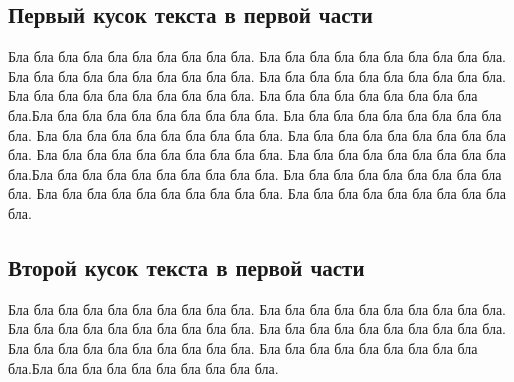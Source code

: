 \documentclass[12pt, a4paper]{article}
\begin{document}
\subsection{Первый кусок текста в первой части}
Бла бла бла бла бла бла бла бла бла бла. Бла бла бла бла бла бла бла бла бла бла. Бла бла бла бла бла бла бла бла бла бла. Бла бла бла бла бла бла бла бла бла бла. Бла бла бла бла бла бла бла бла бла бла. Бла бла бла бла бла бла бла бла бла бла.Бла бла бла бла бла бла бла бла бла бла. Бла бла бла бла бла бла бла бла бла бла. Бла бла бла бла бла бла бла бла бла бла. Бла бла бла бла бла бла бла бла бла бла. Бла бла бла бла бла бла бла бла бла бла. Бла бла бла бла бла бла бла бла бла бла.Бла бла бла бла бла бла бла бла бла бла. Бла бла бла бла бла бла бла бла бла бла. Бла бла бла бла бла бла бла бла бла бла. Бла бла бла бла бла бла бла бла бла бла.

\subsection{Второй кусок текста в первой части}

Бла бла бла бла бла бла бла бла бла бла. Бла бла бла бла бла бла бла бла бла бла. Бла бла бла бла бла бла бла бла бла бла. Бла бла бла бла бла бла бла бла бла бла. Бла бла бла бла бла бла бла бла бла бла. Бла бла бла бла бла бла бла бла бла бла.Бла бла бла бла бла бла бла бла бла бла.
\end{document}
